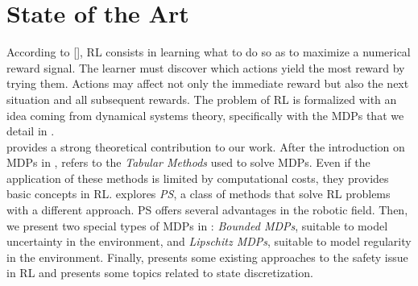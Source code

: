 \chapter{State of the Art} \label{chap:stateoftheart}

According to [\cite{sutton2018reinforcement}], \acf{RL} consists in learning what to do so as to maximize a numerical reward signal. The learner must discover which actions yield the most reward by trying them. Actions may affect not only the immediate reward but also the next situation and all subsequent rewards. The problem of \ac{RL} is formalized with an idea coming from dynamical systems theory, specifically with the \acf{MDPs} that we detail in .\\
\newline
{} provides a strong theoretical contribution to our work. After the introduction on \ac{MDPs} in ,  refers to the \emph{Tabular Methods} used to solve \ac{MDPs}. Even if the application of these methods is limited by computational costs, they provides basic concepts in \ac{RL}.  explores \emph{\acf{PS}}, a class of methods that solve \ac{RL} problems with a different approach. \ac{PS} offers several advantages in the robotic field. Then, we present two special types of \ac{MDPs} in : \emph{Bounded \ac{MDPs}}, suitable to model uncertainty in the environment, and \emph{Lipschitz \ac{MDPs}}, suitable to model regularity in the environment. Finally,  presents some existing approaches to the safety issue in \ac{RL} and  presents some topics related to state discretization.

